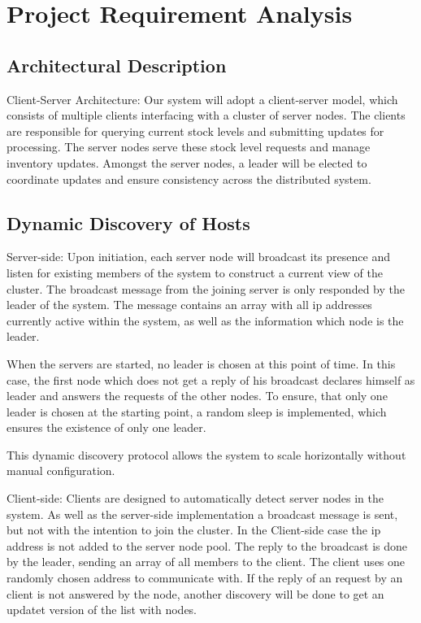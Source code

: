 \chapter{Project Requirement Analysis}\label{ch:ProjectRequirementAnalysis}
\section{Architectural Description}\label{sec:ArchitecturalDescription}
Client-Server Architecture: Our system will adopt a client-server model, which consists of multiple clients interfacing with a cluster of server nodes. The clients are responsible for querying current stock levels and submitting updates for processing. The server nodes serve these stock level requests and manage inventory updates. Amongst the server nodes, a leader will be elected to coordinate updates and ensure consistency across the distributed system.


\section{Dynamic Discovery of Hosts}\label{sec:DynamicDiscoveryOfHosts}
Server-side: Upon initiation, each server node will broadcast its presence and listen for existing members of the system to construct a current view of the cluster. The broadcast message from the joining server is only responded by the
leader of the system. The message contains an array with all ip addresses currently active within the system, as well as the information which node is the leader.

When the servers are started, no leader is chosen at this point of time. In this case, the first node which does not get a reply of his broadcast declares himself as leader and answers the requests of the other nodes.
To ensure, that only one leader is chosen at the starting point, a random sleep is implemented, which ensures the existence of only one leader.

This dynamic discovery protocol allows the system to scale horizontally without manual configuration.

Client-side: Clients are designed to automatically detect server nodes in the system. As well as the server-side implementation a broadcast message is sent, but not with the intention
to join the cluster. In the Client-side case the ip address is not added to the server node pool. The reply to the broadcast is done by the leader, sending an array of all members to the client. 
The client uses one randomly chosen address to communicate with. If the reply of an request by an client is not answered by the node, another discovery will be done to get an updatet version of the list with nodes.

